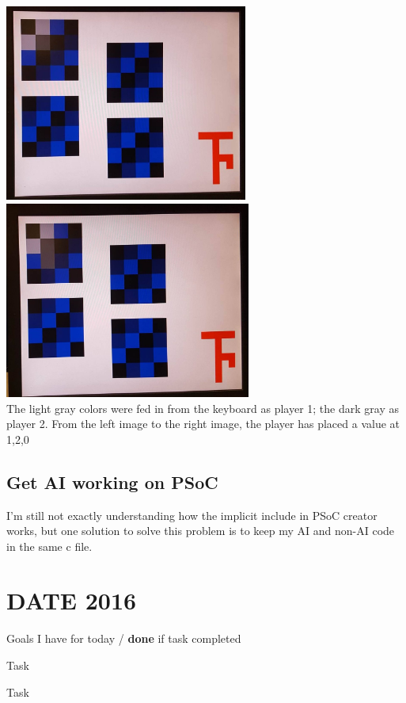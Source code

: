\documentclass[12pt,twoside]{article}
\newenvironment{tight_itemize}{
\begin{itemize}
  \setlength{\itemsep}{0pt}
  \setlength{\parskip}{0pt}
}{\end{itemize}}
\begin{document}
\begin{center}
\includegraphics[width = 80mm]{Pics/5-4b.jpg}
\includegraphics[width = 81mm]{Pics/5-4a.jpg}
\\ The light gray colors were fed in from the keyboard as player 1; the dark gray as player 2. From the left image to the right image, the player has placed a value at 1,2,0 \end{center}

\subsection{Get AI working on PSoC }
I'm still not exactly understanding how the implicit include in PSoC creator works, but one solution to solve this problem is to keep my AI and non-AI code in the same c file. 



\newpage
\section{DATE 2016}

Goals I have for today / {\bf done} if task completed
\begin{tight_itemize}
\item Task %
\item Task 
\end{tight_itemize}
\end{document}
